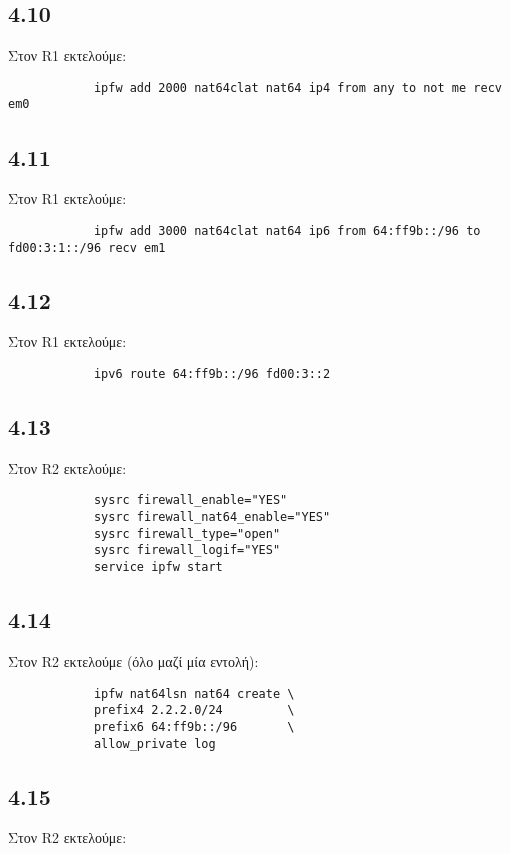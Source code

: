 \documentclass[a4paper, 12pt]{article}
\begin{document}
	\subsection*{4.10}
		Στον R1 εκτελούμε:
		
		\begin{verbatim}
			ipfw add 2000 nat64clat nat64 ip4 from any to not me recv em0
		\end{verbatim}

	\subsection*{4.11}
		Στον R1 εκτελούμε:
		
		\begin{verbatim}
			ipfw add 3000 nat64clat nat64 ip6 from 64:ff9b::/96 to fd00:3:1::/96 recv em1
		\end{verbatim}

	\subsection*{4.12}
		Στον R1 εκτελούμε:
		
		\begin{verbatim}
			ipv6 route 64:ff9b::/96 fd00:3::2
		\end{verbatim}

	\subsection*{4.13}
		Στον R2 εκτελούμε:
		
		\begin{verbatim}
			sysrc firewall_enable="YES"
			sysrc firewall_nat64_enable="YES"
			sysrc firewall_type="open"
			sysrc firewall_logif="YES"
			service ipfw start
		\end{verbatim}

	\subsection*{4.14}
		Στον R2 εκτελούμε (όλο μαζί μία εντολή):
		
		\begin{verbatim}
			ipfw nat64lsn nat64 create \
			prefix4 2.2.2.0/24         \
			prefix6 64:ff9b::/96       \
			allow_private log
		\end{verbatim}

	\subsection*{4.15}
		Στον R2 εκτελούμε:
		
\end{document}
